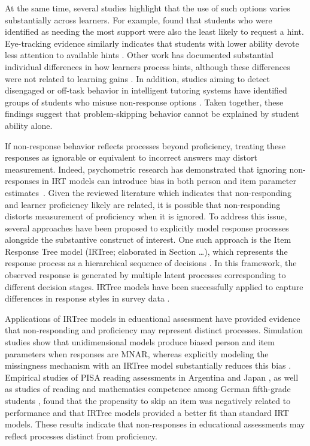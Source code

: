 \documentclass[12pt]{article}
\begin{document}
At the same time, several studies highlight that the use of such options varies substantially across learners. For example, \textcite{norum2024student} found that students who were identified as needing the most support were also the least likely to request a hint. Eye-tracking evidence similarly indicates that students with lower ability devote less attention to available hints \parencite{conati2013understanding}. Other work has documented substantial individual differences in how learners process hints, although these differences were not related to learning gains \parencite{goldin2012learner, goldin2013hints}. In addition, studies aiming to detect disengaged or off-task behavior in intelligent tutoring systems have identified groups of students who misuse non-response options \parencite{baker2004off, baker2004detecting, baker2005performance, beck2004using}. Taken together, these findings suggest that problem-skipping behavior cannot be explained by student ability alone.

If non-response behavior reflects processes beyond proficiency, treating these responses as ignorable or equivalent to incorrect answers may distort measurement. Indeed, psychometric research has demonstrated that ignoring non-responses in IRT models can introduce bias in both person and item parameter estimates~\parencite{finch2008estimation, mislevy1996missing, pohl2014dealing, holman2005modelling, debeer2017modeling}. Given the reviewed literature which indicates that non-responding and learner proficiency likely are related, it is possible that non-responding distorts measurement of proficiency when it is ignored. To address this issue, several approaches have been proposed to explicitly model response processes alongside the substantive construct of interest. One such approach is the Item Response Tree model (IRTree; elaborated in Section \dots), which represents the response process as a hierarchical sequence of decisions \parencite{bockenholt2012modeling, de2012irtrees, thissen2013two}. In this framework, the observed response is generated by multiple latent processes corresponding to different decision stages. IRTree models have been successfully applied to capture differences in response styles in survey data \parencite{bockenholt2017response, thissen2013two}.

Applications of IRTree models in educational assessment have provided evidence that non-responding and proficiency may represent distinct processes. Simulation studies show that unidimensional models produce biased person and item parameters when responses are MNAR, whereas explicitly modeling the missingness mechanism with an IRTree model substantially reduces this bias \parencite{debeer2017modeling}. Empirical studies of PISA reading assessments in Argentina \parencite{debeer2017modeling} and Japan \parencite{okumura2014empirical}, as well as studies of reading and mathematics competence among German fifth-grade students \parencite{pohl2014dealing}, found that the propensity to skip an item was negatively related to performance and that IRTree models provided a better fit than standard IRT models. These results indicate that non-responses in educational assessments may reflect processes distinct from proficiency.
\end{document}
